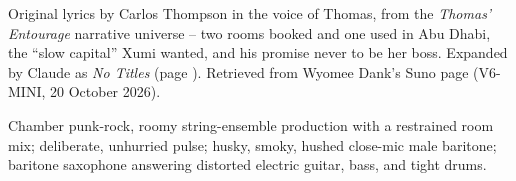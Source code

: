 
\label{sec:abu-dhabi}
\begin{notes}
Original lyrics by Carlos Thompson in the voice of Thomas, from the \emph{Thomas' Entourage} narrative universe -- two rooms booked and one used in Abu Dhabi, the ``slow capital'' Xumi wanted, and his promise never to be her boss. Expanded by Claude as \emph{No Titles} (page \pageref{sec:no-titles}). Retrieved from Wyomee Dank's Suno page (V6-MINI, 20 October 2026).
\end{notes}
\begin{style}
Chamber punk-rock, roomy string-ensemble production with a restrained room mix; deliberate, unhurried pulse; husky, smoky, hushed close-mic male baritone; baritone saxophone answering distorted electric guitar, bass, and tight drums.
\end{style}
